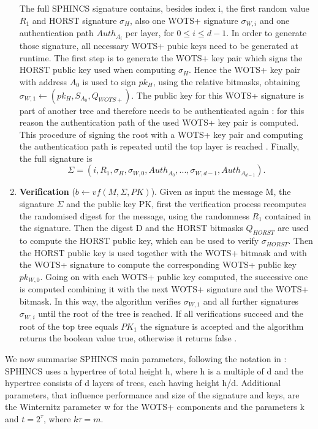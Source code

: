 \documentclass[a4paper,12pt]{article}
\begin{document}
\begin{enumerate}
    The full SPHINCS signature contains, besides index i, the first random value $R_{1}$ and HORST signature $\sigma_{H}$, also one WOTS+ signature $\sigma_{W,i}$ and one authentication path $Auth_{A_{i}}$ per layer, for $0 \leq i \leq d-1$. In order to generate those signature, all necessary WOTS+ pubic keys need to be generated at runtime.
    The first step is to generate the WOTS+ key pair which signs the HORST public key used when computing $\sigma_{H}$. Hence the WOTS+ key pair with address $A_{0}$ is used to sign $pk_{H}$, using the relative bitmasks, obtaining $\sigma_{W,1} \gets (pk_{H} , S_{A_{0}} , Q_{WOTS+})$.
    The public key for this WOTS+ signature is part of another tree and therefore needs to be authenticated again \cite{4_wings}: for this reason the authentication path of the used WOTS+ key pair is computed.
    This procedure of signing the root with a WOTS+ key pair and computing the authentication path is repeated until the top layer is reached \cite{4_wings}.
    Finally, the full signature is $$\Sigma = (i, R_{1}, \sigma_{H} , \sigma_{W,0} , Auth_{A_{0}} , . . . , \sigma_{W,d-1} , Auth_{A_{d-1}}).$$
    \item \textbf{Verification} ($b \gets vf(M, \Sigma, PK)$). Given as input the message M, the signature $\Sigma$ and the public key PK, first the verification process recomputes the randomised digest for the message, using the randomness $R_1$ contained in the signature. Then the digest D and the HORST bitmasks $Q_{HORST}$ are used to compute the HORST public key, which can be used to verify $\sigma_{HORST}$.
    Then the HORST public key is used together with the WOTS+ bitmask and with the WOTS+ signature to compute the corresponding WOTS+ public key $pk_{W,0}$. Going on with each WOTS+ public key computed, the successive one is computed combining it with the next WOTS+ signature and the WOTS+ bitmask. In this way, the algorithm verifies $\sigma_{W,1}$ and all further signatures $\sigma_{W,i}$ until the root of the tree is reached. If all verifications succeed and the root of the top tree equals $PK_{1}$ the signature is accepted and the algorithm returns the boolean value true, otherwise it returns false \cite{4_wings}.
\end{enumerate}

We now summarise SPHINCS main parameters, following the notation in \cite{1_sphincspaper}: SPHINCS uses a hypertree of total height h, where h is a multiple of d and the hypertree consists of d layers of trees, each having height h/d. Additional parameters, that influence performance and size of the signature and keys, are the Winternitz parameter w for the WOTS+ components and the parameters k and $t=2^{\tau}$, where $k\tau = m$.
\end{document}
